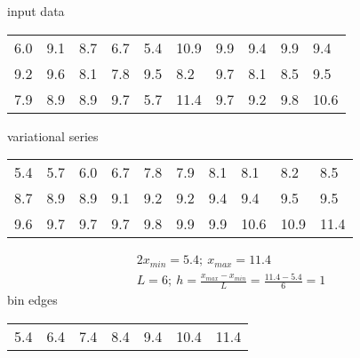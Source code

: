 \documentclass{article}%
\begin{document}
%
\normalsize%
input data%
\begin{longtable}{l l l l l l l l l l }%
6.0&9.1&8.7&6.7&5.4&10.9&9.9&9.4&9.9&9.4\\%
9.2&9.6&8.1&7.8&9.5&8.2&9.7&8.1&8.5&9.5\\%
7.9&8.9&8.9&9.7&5.7&11.4&9.7&9.2&9.8&10.6\\%
\end{longtable}%
variational series%
\begin{longtable}{l l l l l l l l l l }%
5.4&5.7&6.0&6.7&7.8&7.9&8.1&8.1&8.2&8.5\\%
8.7&8.9&8.9&9.1&9.2&9.2&9.4&9.4&9.5&9.5\\%
9.6&9.7&9.7&9.7&9.8&9.9&9.9&10.6&10.9&11.4\\%
\end{longtable}%
\begin{alignat*}{2}%
x_{min} = 5.4; ~ x_{max} = 11.4 \\%
L = 6;
            ~ h = \frac { x_{max} - x_{min} } L
                = \frac { 11.4 - 5.4 } 6
                = 1%
\end{alignat*}%
bin edges%
\begin{longtable}{l l l l l l l }%
5.4&6.4&7.4&8.4&9.4&10.4&11.4\\%
\end{longtable}%
\end{document}

